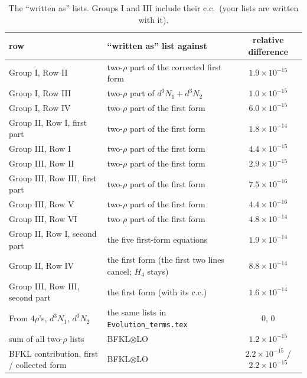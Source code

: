 \documentclass[10pt]{article}
\begin{document}
\begin{table}[H]\centering\small
\begin{tabular}{llc}
\toprule
row & ``written as'' list against & relative difference\\
\midrule
Group I, Row II & two-$\rho$ part of the corrected first form & $1.9\times10^{-15}$\\
Group I, Row III & two-$\rho$ part of $d^3N_1+d^3N_2$ & $1.0\times10^{-15}$\\
Group I, Row IV & two-$\rho$ part of the first form & $6.0\times10^{-15}$\\
Group II, Row I, first part & two-$\rho$ part of the first form & $1.8\times10^{-14}$\\
Group III, Row I & two-$\rho$ part of the first form & $4.4\times10^{-15}$\\
Group III, Row II & two-$\rho$ part of the first form & $2.9\times10^{-15}$\\
Group III, Row III, first part & two-$\rho$ part of the first form & $7.5\times10^{-16}$\\
Group III, Row V & two-$\rho$ part of the first form & $4.4\times10^{-16}$\\
Group III, Row VI & two-$\rho$ part of the first form & $4.8\times10^{-14}$\\
\midrule
Group II, Row I, second part & the five first-form equations & $1.9\times10^{-14}$\\
Group II, Row IV & the first form (the first two lines cancel; $H_4$ stays) & $8.8\times10^{-14}$\\
Group III, Row III, second part & the first form (with its c.c.) & $1.6\times10^{-14}$\\
\midrule
From $4\rho$'s, $d^3N_1$, $d^3N_2$ & the same lists in \texttt{Evolution\_terms.tex} & $0$, $0$\\
\midrule
sum of all two-$\rho$ lists & BFKL$\otimes$LO & $1.2\times10^{-15}$\\
BFKL contribution, first / collected form & BFKL$\otimes$LO & $2.2\times10^{-15}$ / $2.2\times10^{-15}$\\
\bottomrule
\end{tabular}
\caption{The ``written as'' lists. Groups I and III include their c.c.\ (your lists are written with it).}\label{tab:written}
\end{table}
\end{document}
